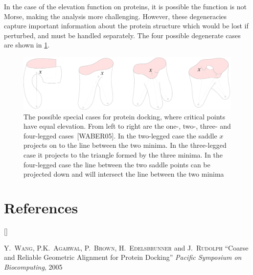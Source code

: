 \documentclass{article}
\renewcommand{\cite}[1]{[#1]}
\def\beginrefs{\begin{list}%
        {[\arabic{equation}]}{\usecounter{equation}
         \setlength{\leftmargin}{2.0truecm}\setlength{\labelsep}{0.4truecm}%
         \setlength{\labelwidth}{1.6truecm}}}
\def\endrefs{\end{list}}
\def\bibentry#1{\item[\hbox{[#1]}]}
\begin{document}
In the case of the elevation function on proteins, it is possible the function is not Morse,
making the analysis more challenging. However, these degeneracies capture important
information about the protein structure which would be lost if perturbed, and must be handled
separately. The four possible degenerate cases are shown in \cref{fig:protein-legs}.

\begin{figure}
	\centering
	\includegraphics[width=\textwidth]{fig/protein-leg-cases}
	\caption{\label{fig:protein-legs} The possible special cases for protein docking, where
	critical points have equal elevation. From left to right are the one-, two-,
	three- and four-legged cases~\cite{WABER05}. In the two-legged case the saddle $x$
	projects on to the line between the two minima. In the three-legged case it projects
	to the triangle formed by the three minima. In the four-legged case the line between
	the two saddle points can be projected down and will intersect the line between the
	two minima}
\end{figure}

\section*{References}
\beginrefs

\bibentry{WABER05}\textsc{Y.~Wang}, \textsc{P.K.~Agarwal}, \textsc{P.~Brown},
\textsc{H.~Edelsbrunner} and \textsc{J.~Rudolph}
``Coarse and Reliable Geometric Alignment for Protein Docking''
\textit{Pacific Symposium on Biocomputing},
2005

\endrefs
\end{document}
